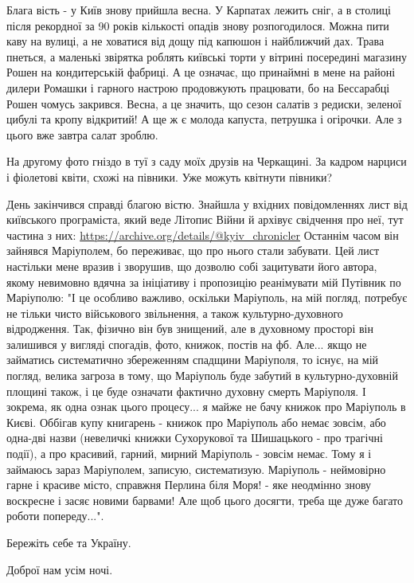 Блага вість - у Київ знову прийшла весна. У Карпатах лежить сніг, а в столиці
після рекордної за 90 років кількості опадів знову розпогодилося. Можна пити
каву на вулиці, а не ховатися від дощу під капюшон і найближчий дах. Трава
пнеться, а маленькі звірятка роблять київські торти у вітрині посередині
магазину Рошен на кондитерській фабриці. А це означає, що принаймні в мене на
районі дилери Ромашки і гарного настрою продовжують працювати, бо на Бессарабці
Рошен чомусь закрився. Весна, а це значить, що сезон салатів з редиски, зеленої
цибулі та кропу відкритий! А ще ж є молода капуста, петрушка і огірочки. Але з
цього вже завтра салат зроблю. 

На другому фото гніздо в туї з саду моїх друзів на Черкащині. За кадром нарциси
і фіолетові квіти, схожі на півники. Уже можуть квітнути півники?

День закінчився справді благою вістю. Знайшла у вхідних повідомленнях лист від
київського програміста, який веде Літопис Війни й архівує свідчення про неї,
тут частина з них: \url{https://archive.org/details/@kyiv_chronicler} Останнім часом
він зайнявся Маріуполем, бо переживає, що про нього стали забувати. Цей лист
настільки мене вразив і зворушив, що дозволю собі зацитувати його автора, якому
невимовно вдячна за ініціативу і пропозицію реанімувати мій Путівник по
Маріуполю: "І це особливо важливо, оскільки Маріуполь, на мій погляд, потребує
не тільки чисто військового звільнення, а також культурно-духовного
відродження. Так, фізично він був знищений, але в духовному просторі він
залишився у вигляді спогадів, фото, книжок, постів на фб. Але... якщо не
займатись систематично збереженням спадщини Маріуполя, то існує, на мій погляд,
велика загроза в тому, що Маріуполь буде забутий в культурно-духовній площині
також, і це буде означати фактично духовну смерть Маріуполя. І зокрема, як одна
ознак цього процесу... я майже не бачу книжок про Маріуполь в Києві. Оббігав
купу книгарень - книжок про Маріуполь або немає зовсім, або одна-дві назви
(невеличкі книжки Сухорукової та Шишацького - про трагічні події), а про
красивий, гарний, мирний Маріуполь - зовсім немає. Тому я і займаюсь зараз
Маріуполем, записую, систематизую. Маріуполь - неймовірно гарне і красиве
місто, справжня Перлина біля Моря! - яке неодмінно знову воскресне і засяє
новими барвами! Але щоб цього досягти, треба ще дуже багато роботи
попереду...".

Бережіть себе та Україну.

Доброї нам усім ночі.

